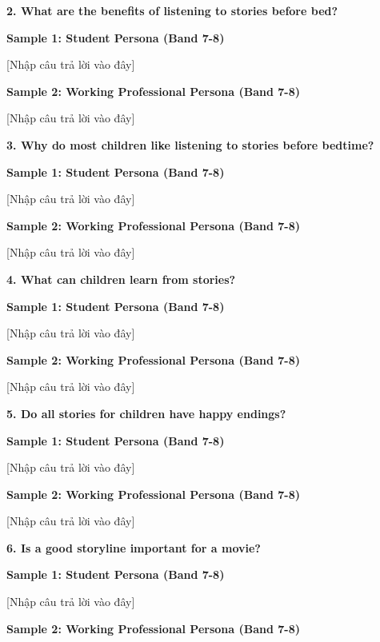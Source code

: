 \begin{ieltsquestion}
\textbf{2. What are the benefits of listening to stories before bed?}
\end{ieltsquestion}
\textbf{Sample 1: Student Persona (Band 7-8)}

[Nhập câu trả lời vào đây]

\textbf{Sample 2: Working Professional Persona (Band 7-8)}

[Nhập câu trả lời vào đây]

\separator

\begin{ieltsquestion}
\textbf{3. Why do most children like listening to stories before bedtime?}
\end{ieltsquestion}
\textbf{Sample 1: Student Persona (Band 7-8)}

[Nhập câu trả lời vào đây]

\textbf{Sample 2: Working Professional Persona (Band 7-8)}

[Nhập câu trả lời vào đây]

\separator

\begin{ieltsquestion}
\textbf{4. What can children learn from stories?}
\end{ieltsquestion}
\textbf{Sample 1: Student Persona (Band 7-8)}

[Nhập câu trả lời vào đây]

\textbf{Sample 2: Working Professional Persona (Band 7-8)}

[Nhập câu trả lời vào đây]

\separator

\begin{ieltsquestion}
\textbf{5. Do all stories for children have happy endings?}
\end{ieltsquestion}
\textbf{Sample 1: Student Persona (Band 7-8)}

[Nhập câu trả lời vào đây]

\textbf{Sample 2: Working Professional Persona (Band 7-8)}

[Nhập câu trả lời vào đây]

\separator

\begin{ieltsquestion}
\textbf{6. Is a good storyline important for a movie?}
\end{ieltsquestion}
\textbf{Sample 1: Student Persona (Band 7-8)}

[Nhập câu trả lời vào đây]

\textbf{Sample 2: Working Professional Persona (Band 7-8)}

